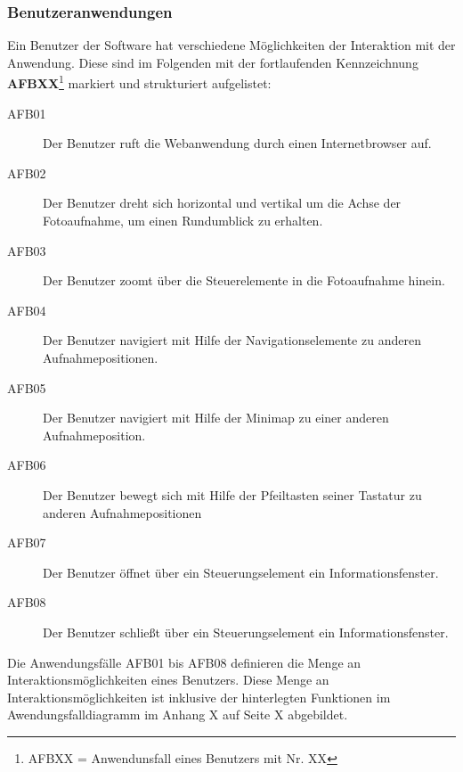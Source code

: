 \subsubsection{Benutzeranwendungen}
\label{sec:Benutzeranwendungen}

Ein Benutzer der Software hat verschiedene Möglichkeiten der Interaktion mit
der Anwendung. Diese sind im Folgenden mit der fortlaufenden
Kennzeichnung \textbf{AFBXX}\footnote{AFBXX = Anwendunsfall eines Benutzers mit
Nr. XX} markiert und strukturiert aufgelistet:

\begin{description}
  \item[AFB01] Der Benutzer ruft die Webanwendung durch einen Internetbrowser
  auf.
  \item[AFB02] Der Benutzer dreht sich horizontal und vertikal um die Achse
  der Fotoaufnahme, um einen Rundumblick zu erhalten.
  \item[AFB03] Der Benutzer zoomt über die Steuerelemente in die Fotoaufnahme
  hinein.
  \item[AFB04] Der Benutzer navigiert mit Hilfe der Navigationselemente zu
  anderen Aufnahmepositionen.
  \item[AFB05] Der Benutzer navigiert mit Hilfe der Minimap zu einer anderen
  Aufnahmeposition.
  \item[AFB06] Der Benutzer bewegt sich mit Hilfe der Pfeiltasten seiner
  Tastatur zu anderen Aufnahmepositionen
  \item[AFB07] Der Benutzer öffnet über ein Steuerungselement ein
  Informationsfenster.
  \item[AFB08] Der Benutzer schließt über ein Steuerungselement ein
  Informationsfenster.
\end{description}

Die Anwendungsfälle AFB01 bis AFB08 definieren die Menge an
Interaktionsmöglichkeiten eines Benutzers. Diese Menge an
Interaktionsmöglichkeiten ist inklusive der hinterlegten Funktionen im
Awendungsfalldiagramm im Anhang X auf Seite X abgebildet.
